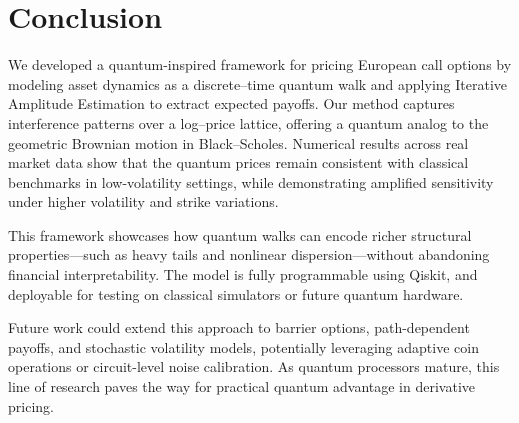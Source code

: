 \documentclass[11pt]{article}
\begin{document}
\section{Conclusion}
We developed a quantum-inspired framework for pricing European call options by modeling asset dynamics as a discrete--time quantum walk and applying Iterative Amplitude Estimation to extract expected payoffs. Our method captures interference patterns over a log--price lattice, offering a quantum analog to the geometric Brownian motion in Black--Scholes. Numerical results across real market data show that the quantum prices remain consistent with classical benchmarks in low-volatility settings, while demonstrating amplified sensitivity under higher volatility and strike variations.

This framework showcases how quantum walks can encode richer structural properties—such as heavy tails and nonlinear dispersion—without abandoning financial interpretability. The model is fully programmable using Qiskit, and deployable for testing on classical simulators or future quantum hardware.

Future work could extend this approach to barrier options, path-dependent payoffs, and stochastic volatility models, potentially leveraging adaptive coin operations or circuit-level noise calibration. As quantum processors mature, this line of research paves the way for practical quantum advantage in derivative pricing.




\end{document}
